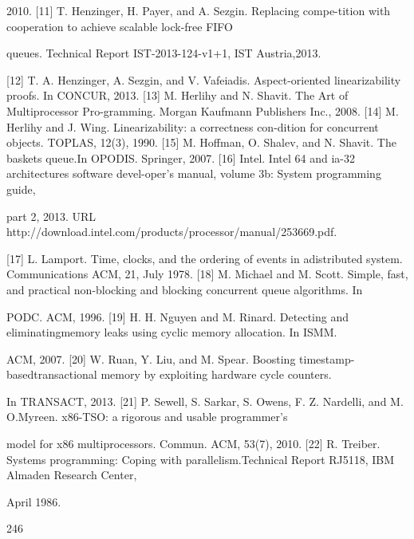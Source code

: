 2010.
[11] T. Henzinger, H. Payer, and A. Sezgin. Replacing compe-tition with cooperation to achieve scalable lock-free FIFO

queues. Technical Report IST-2013-124-v1+1, IST Austria,2013.

[12] T. A. Henzinger, A. Sezgin, and V. Vafeiadis. Aspect-oriented linearizability proofs. In CONCUR, 2013.
[13] M. Herlihy and N. Shavit. The Art of Multiprocessor Pro-gramming. Morgan Kaufmann Publishers Inc., 2008.
[14] M. Herlihy and J. Wing. Linearizability: a correctness con-dition for concurrent objects. TOPLAS, 12(3), 1990.
[15] M. Hoffman, O. Shalev, and N. Shavit. The baskets queue.In OPODIS. Springer, 2007.
[16] Intel. Intel 64 and ia-32 architectures software devel-oper's manual, volume 3b: System programming guide,

part 2, 2013. URL http://download.intel.com/products/processor/manual/253669.pdf.

[17] L. Lamport. Time, clocks, and the ordering of events in adistributed system. Communications ACM, 21, July 1978.
[18] M. Michael and M. Scott. Simple, fast, and practical non-blocking and blocking concurrent queue algorithms. In

PODC. ACM, 1996.
[19] H. H. Nguyen and M. Rinard. Detecting and eliminatingmemory leaks using cyclic memory allocation. In ISMM.

ACM, 2007.
[20] W. Ruan, Y. Liu, and M. Spear. Boosting timestamp-basedtransactional memory by exploiting hardware cycle counters.

In TRANSACT, 2013.
[21] P. Sewell, S. Sarkar, S. Owens, F. Z. Nardelli, and M. O.Myreen. x86-TSO: a rigorous and usable programmer's

model for x86 multiprocessors. Commun. ACM, 53(7), 2010.
[22] R. Treiber. Systems programming: Coping with parallelism.Technical Report RJ5118, IBM Almaden Research Center,

April 1986.

246